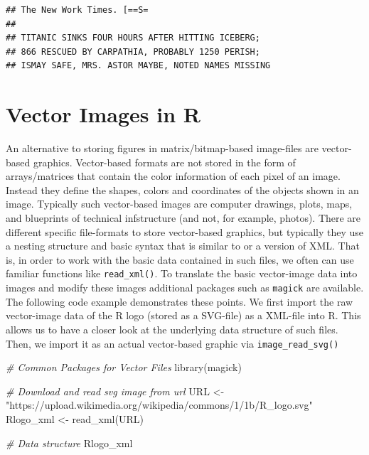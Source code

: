 \documentclass[
  12pt,
]{style/krantz}
\newenvironment{Shaded}{\begin{snugshade}}{\end{snugshade}}
\newcommand{\CommentTok}[1]{\textcolor[rgb]{0.56,0.35,0.01}{\textit{#1}}}
\newcommand{\FunctionTok}[1]{\textcolor[rgb]{0.00,0.00,0.00}{#1}}
\newcommand{\NormalTok}[1]{#1}
\newcommand{\OtherTok}[1]{\textcolor[rgb]{0.56,0.35,0.01}{#1}}
\newcommand{\StringTok}[1]{\textcolor[rgb]{0.31,0.60,0.02}{#1}}
\begin{document}
\begin{verbatim}
## The New Work Times. [==S=
## 
## TITANIC SINKS FOUR HOURS AFTER HITTING ICEBERG;
## 866 RESCUED BY CARPATHIA, PROBABLY 1250 PERISH;
## ISMAY SAFE, MRS. ASTOR MAYBE, NOTED NAMES MISSING
\end{verbatim}

\hypertarget{vector-images-in-r}{%
\section{Vector Images in R}\label{vector-images-in-r}}

An alternative to storing figures in matrix/bitmap-based image-files are vector-based graphics. Vector-based formats are not stored in the form of arrays/matrices that contain the color information of each pixel of an image. Instead they define the shapes, colors and coordinates of the objects shown in an image. Typically such vector-based images are computer drawings, plots, maps, and blueprints of technical infstructure (and not, for example, photos). There are different specific file-formats to store vector-based graphics, but typically they use a nesting structure and basic syntax that is similar to or a version of XML. That is, in order to work with the basic data contained in such files, we often can use familiar functions like \texttt{read\_xml()}. To translate the basic vector-image data into images and modify these images additional packages such as \texttt{magick} are available. The following code example demonstrates these points. We first import the raw vector-image data of the R logo (stored as a SVG-file) as a XML-file into R. This allows us to have a closer look at the underlying data structure of such files. Then, we import it as an actual vector-based graphic via \texttt{image\_read\_svg()}

\begin{Shaded}
\begin{Highlighting}[]
\CommentTok{\# Common Packages for Vector Files}
\FunctionTok{library}\NormalTok{(magick)}

\CommentTok{\# Download and read svg image from url}
\NormalTok{URL }\OtherTok{\textless{}{-}} \StringTok{"https://upload.wikimedia.org/wikipedia/commons/1/1b/R\_logo.svg"}
\NormalTok{Rlogo\_xml }\OtherTok{\textless{}{-}} \FunctionTok{read\_xml}\NormalTok{(URL)}

\CommentTok{\# Data structure}
\NormalTok{Rlogo\_xml }
\end{Highlighting}
\end{Shaded}
\end{document}
